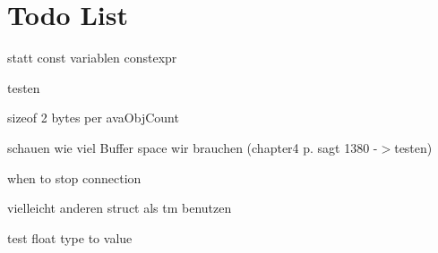 \chapter{Todo List}
\hypertarget{todo}{}\label{todo}

\begin{DoxyRefList}
\item[Member \doxylink{definitions_8h_a62ad1596044c3dac9b3ac5a6f0deff8d}{maxbuffersize} ]\label{todo__todo000001}%
%
statt const variablen constexpr  
\item[Member \doxylink{definitions_8h_a1301dfef2e69c9df57a27cb393b42142}{Read\+Bytes\+From\+Buffer} (const char \texorpdfstring{$\ast$}{*}array, size\+\_\+t start\+Index, size\+\_\+t num\+Bytes)]\label{todo__todo000002}%
%
testen  
\item[Member \doxylink{class_socket_client_a796a16d693abdbf6536731dbb1b9207d}{Socket\+Client\+::Decode\+MDSAttrib\+Objects} (std\+::unique\+\_\+ptr$<$ Ava\+Obj $>$ avaobj, char \texorpdfstring{$\ast$}{*}attriblistobjects\+\_\+buffer, size\+\_\+t count)]\label{todo__todo000005}%
%
sizeof 2 bytes per ava\+Obj\+Count  
\item[Member \doxylink{class_socket_client_ae3962f762b411e9b4bf06be013c3c9f1}{Socket\+Client\+::establish\+Lan\+Connection} ()]\label{todo__todo000022}%
%
schauen wie viel Buffer space wir brauchen (chapter4 p. sagt 1380 -\/\texorpdfstring{$>$}{>}testen) 

\label{todo__todo000023}%
%
when to stop connection  
\item[Member \doxylink{class_socket_client_a0168710b16154dfa3e3db26fd692a714}{Socket\+Client\+::Get\+Absolute\+Time\+From\+BCDFormat} (char \texorpdfstring{$\ast$}{*}bcdtimebuffer)]\label{todo__todo000006}%
%
vielleicht anderen struct als tm benutzen  
\item[Member \doxylink{class_socket_client_a67172065a09c78492f4635bea8e1a678}{Socket\+Client\+::Poll\+Packet\+Decoder} (char \texorpdfstring{$\ast$}{*}packetbuffer, size\+\_\+t headersize)]\label{todo__todo000007}%
%
  
\item[Member \doxylink{class_socket_client_ab3e591d94c533d291d854f94b443f0a7}{Socket\+Client\+::Read\+Numeric\+Observation\+Value} (char \texorpdfstring{$\ast$}{*}buffer)]\label{todo__todo000015}%
%
test float type to value 


\end{DoxyRefList}
